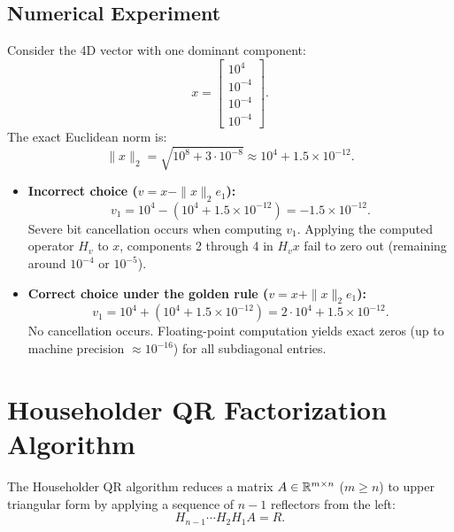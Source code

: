 \subsection{Numerical Experiment}
Consider the 4D vector with one dominant component:
\begin{equation}
    x = \begin{bmatrix} 10^4 \\ 10^{-4} \\ 10^{-4} \\ 10^{-4} \end{bmatrix}.
\end{equation}
The exact Euclidean norm is:
\begin{equation}
    \|x\|_2 = \sqrt{10^8 + 3 \cdot 10^{-8}} \approx 10^4 + 1.5 \times 10^{-12}.
\end{equation}
\begin{itemize}
    \item \textbf{Incorrect choice ($v = x - \|x\|_2 e_1$):}
    \begin{equation}
        v_1 = 10^4 - (10^4 + 1.5 \times 10^{-12}) = -1.5 \times 10^{-12}.
    \end{equation}
    Severe bit cancellation occurs when computing $v_1$. Applying the computed operator $H_v$ to $x$, components 2 through 4 in $H_v x$ fail to zero out (remaining around $10^{-4}$ or $10^{-5}$).
    \item \textbf{Correct choice under the golden rule ($v = x + \|x\|_2 e_1$):}
    \begin{equation}
        v_1 = 10^4 + (10^4 + 1.5 \times 10^{-12}) = 2 \cdot 10^4 + 1.5 \times 10^{-12}.
    \end{equation}
    No cancellation occurs. Floating-point computation yields exact zeros (up to machine precision $\approx 10^{-16}$) for all subdiagonal entries.
\end{itemize}

\FloatBarrier
\section{Householder QR Factorization Algorithm}
\label{sec:householder-qr-algorithm-en}

The Householder QR algorithm reduces a matrix $A \in \mathbb{R}^{m \times n}$ ($m \ge n$) to upper triangular form by applying a sequence of $n - 1$ reflectors from the left:
\begin{equation}
    H_{n-1} \cdots H_2 H_1 A = R.
\end{equation}

